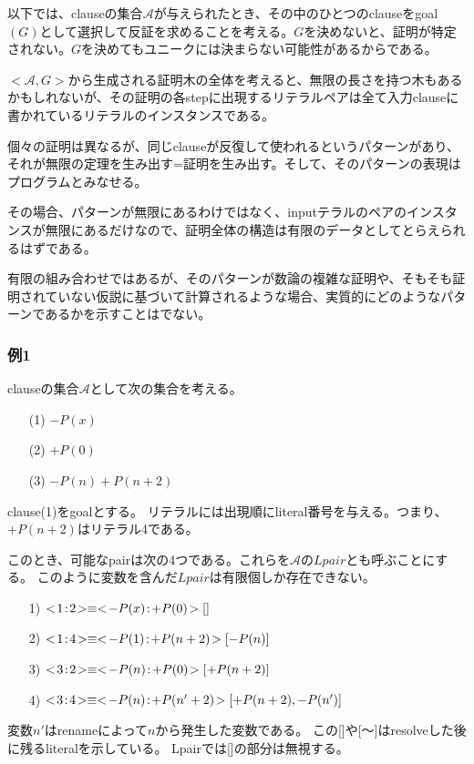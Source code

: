 \documentclass[10pt, onecolumn]{jarticle}   	%
\begin{document}
以下では、clauseの集合$\mathcal{A}$が与えられたとき、その中のひとつのclauseをgoal $(G)$として選択して反証を求めることを考える。$G$を決めないと、証明が特定されない。$G$を決めてもユニークには決まらない可能性があるからである。

$<\mathcal{A},G>$から生成される証明木の全体を考えると、無限の長さを持つ木もあるかもしれないが、その証明の各stepに出現するリテラルペアは全て入力clauseに書かれているリテラルのインスタンスである。

個々の証明は異なるが、同じclauseが反復して使われるというパターンがあり、それが無限の定理を生み出す=証明を生み出す。そして、そのパターンの表現はプログラムとみなせる。

その場合、パターンが無限にあるわけではなく、inputテラルのペアのインスタンスが無限にあるだけなので、証明全体の構造は有限のデータとしてとらえられるはずである。

有限の組み合わせではあるが、そのパターンが数論の複雑な証明や、そもそも証明されていない仮説に基づいて計算されるような場合、実質的にどのようなパターンであるかを示すことはでない。

\subsubsection{例1}
clauseの集合$\mathcal{A}$として次の集合を考える。
\begin{enumerate}
\item [(1)] $-P(x)$
\item [(2)] $+P(0)$
\item [(3)] $-P(n)+P(n+2)$
\end{enumerate}

clause(1)をgoalとする。
リテラルには出現順にliteral番号を与える。つまり、$+P(n+2)$はリテラル4である。

このとき、可能なpairは次の4つである。これらを$\mathcal{A}$の$Lpair$とも呼ぶことにする。
このように変数を含んだ$Lpair$は有限個しか存在できない。

\begin{itemize}
\item [1)]$\unify{1}{2} \equiv \unify{-P(x)}{+P(0)}[]$
\item [2)]$\unify{1}{4} \equiv \unify{-P(1)}{+P(n+2)}[-P(n)]$
\item [3)]$\unify{3}{2} \equiv \unify{-P(n)}{+P(0)}[+P(n+2)]$
\item [4)]$\unify{3}{4} \equiv \unify{-P(n)}{+P(n'+2)}[+P(n+2),-P(n')]$
\end{itemize}

変数$n'$はrenameによって$n$から発生した変数である。
この[]や[〜]はresolveした後に残るliteralを示している。
Lpairでは[]の部分は無視する。
\end{document}

